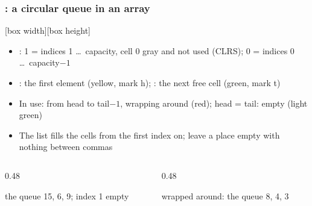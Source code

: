 \documentclass[aspectratio=169,10pt,compress]{beamer}
\begin{document}
\begin{frame}[t,fragile] \frametitle{: a circular queue in an array}

\begin{texcode}
[box width][box height]   %
\end{texcode}

	\begin{itemize}\footnotesize
		\item {}: 1 = indices 1 \dots\ capacity, cell 0 gray and not used (CLRS); 0 = indices 0 \dots\ capacity$-1$
		\item {}: the first element (yellow, mark h); : the next free cell (green, mark t)
		\item In use: from head to tail$-1$, wrapping around (red); head = tail: empty (light green)
		\item The list fills the cells from the first index on; leave a place empty with nothing between commas
	\end{itemize}

	\begin{columns}[T]
		\begin{column}{0.48\textwidth}

\begin{texcode}
\end{texcode}

			\begin{center}

				\footnotesize the queue 15, 6, 9; index 1 empty
			\end{center}
		\end{column}
		\begin{column}{0.48\textwidth}

\begin{texcode}
\end{texcode}

			\begin{center}

				\footnotesize wrapped around: the queue 8, 4, 3
			\end{center}
		\end{column}
	\end{columns}
\end{frame}
\end{document}
